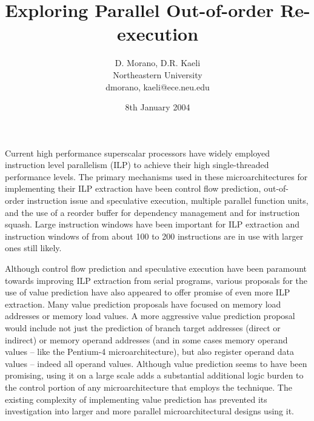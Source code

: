 \documentclass[10pt,twocolumn,dvips]{article}
\begin{document}
%
%
%
\title{Exploring Parallel Out-of-order Re-execution}
%
\author{
D. Morano, D.R. Kaeli\\
Northeastern University\\
{dmorano, kaeli}@ece.neu.edu
}
%
%
\date{8th January 2004}
%
\maketitle
%
%
%
%
Current high performance superscalar processors have widely employed
instruction level parallelism (ILP) to achieve their high
single-threaded performance levels.  
The primary mechanisms used in
these microarchitectures for implementing their ILP extraction have
been
control flow prediction,
out-of- order instruction issue and speculative execution, multiple parallel
function units, and the use of a reorder buffer for dependency management
and for instruction squash.
Large instruction windows have been important for ILP extraction
and
instruction windows of 
from about 100 to 200 instructions are in use with larger ones still
likely.  

Although control flow prediction and speculative execution
have been paramount towards improving ILP extraction from 
serial programs, various proposals for
the use of value prediction have also appeared to offer promise
of even more ILP extraction.
Many value prediction proposals have focused on memory load
addresses or memory load values.
A more aggressive value prediction proposal would include not just
the prediction of branch target addresses (direct or indirect)
or memory operand addresses (and in some cases memory operand values
-- like the Pentium-4 microarchitecture), 
but also register
operand data values -- indeed all operand values.  
Although value prediction seems
to have been promising, 
using it on a large scale adds a substantial 
additional logic burden to the control
portion of any microarchitecture that employs the technique.  
The existing complexity of implementing value prediction has
prevented its investigation into larger and more parallel 
microarchitectural designs using it.
\end{document}
